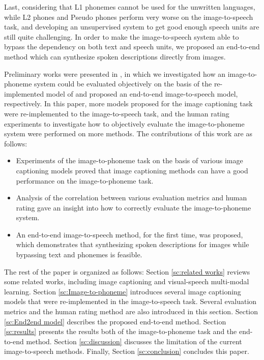 \documentclass[journal,comsoc]{IEEEtran}
\begin{document}
Last, considering that L1 phonemes cannot be used for the unwritten languages, while L2 phones and Pseudo phones perform very worse on the image-to-speech task, and developing an unsupervised system to get good enough speech units are still quite challenging. In order to make the image-to-speech system able to bypass the dependency on both text and speech units, we proposed an end-to-end method which can synthesize spoken descriptions directly from images.

Preliminary works were presented in \cite{van2020evaluating,wang2020show}, in which we investigated how an image-to-phoneme system could be evaluated objectively on the basis of the re-implemented model of \cite{hasegawa2017image2speech} and proposed an end-to-end image-to-speech model, respectively. In this paper, more models proposed for the image captioning task were re-implemented to the image-to-speech task, and the human rating experiments to investigate how to objectively evaluate the image-to-phoneme system were performed on more methods. The contributions of this work are as follows:

\begin{itemize}
   \item Experiments of the image-to-phoneme task on the basis of various image captioning models proved that image captioning methods can have a good performance on the image-to-phoneme task.
    \item Analysis of the correlation between various evaluation metrics and human rating gave an insight into how to correctly evaluate the image-to-phoneme system.
    \item An end-to-end image-to-speech method, for the first time, was proposed, which demonstrates that synthesizing spoken descriptions for images while bypassing text and phonemes is feasible.  
\end{itemize}

The rest of the paper is organized as follows: Section \ref{sc:related works} reviews some related works, including image captioning and visual-speech multi-modal learning. Section \ref{sc:Image-to-phoneme} introduces several image captioning models that were re-implemented in the image-to-speech task. Several evaluation metrics and the human rating method are also introduced in this section. Section \ref{sc:End2end model} describes the proposed end-to-end method. Section \ref{sc:results} presents the results both of the image-to-phoneme task and the end-to-end method. Section \ref{sc:discussion} discusses the limitation of the current image-to-speech methods. Finally, Section \ref{sc:conclusion} concludes this paper. 
\end{document}
